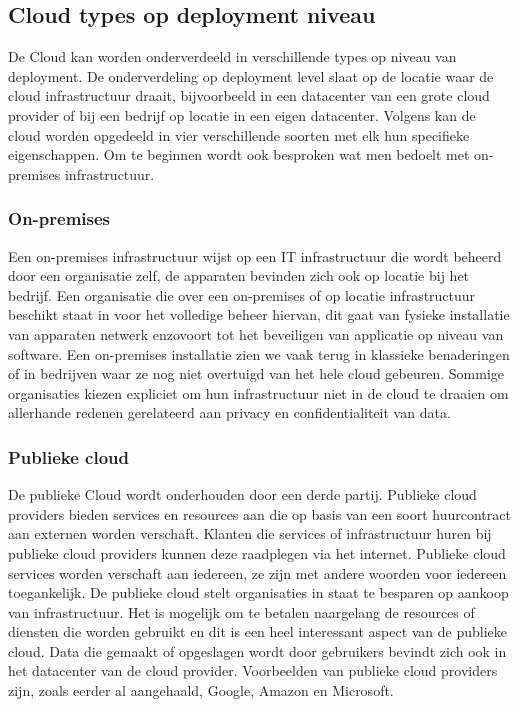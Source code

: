 \subsection{Cloud types op deployment niveau}
\label{cloud-deployment-level}
De Cloud kan worden onderverdeeld in verschillende types op niveau van deployment. De onderverdeling op deployment level slaat op de locatie waar de cloud infrastructuur draait, bijvoorbeeld in een datacenter van een grote cloud provider of bij een bedrijf op locatie in een eigen datacenter. Volgens \textcite{Goyal2014} kan de cloud worden opgedeeld in vier verschillende soorten met elk hun specifieke eigenschappen. Om te beginnen wordt ook besproken wat men bedoelt met on-premises infrastructuur.

\subsubsection{On-premises}
Een on-premises infrastructuur wijst op een IT infrastructuur die wordt beheerd door een organisatie zelf, de apparaten bevinden zich ook op locatie bij het bedrijf. Een organisatie die over een on-premises of op locatie infrastructuur beschikt staat in voor het volledige beheer hiervan, dit gaat van fysieke installatie van apparaten netwerk enzovoort tot het beveiligen van applicatie op niveau van software. Een on-premises installatie zien we vaak terug in klassieke benaderingen of in bedrijven waar ze nog niet overtuigd van het hele cloud gebeuren. Sommige organisaties kiezen expliciet om hun infrastructuur niet in de cloud te draaien om allerhande redenen gerelateerd aan privacy en confidentialiteit van data.

\subsubsection{Publieke cloud}
De publieke Cloud wordt onderhouden door een derde partij. Publieke cloud providers bieden services en resources aan die op basis van een soort huurcontract aan externen worden verschaft. Klanten die services of infrastructuur huren bij publieke cloud providers kunnen deze raadplegen via het internet. Publieke cloud services worden verschaft aan iedereen, ze zijn met andere woorden voor iedereen toegankelijk. De publieke cloud stelt organisaties in staat te besparen op aankoop van infrastructuur. Het is mogelijk om te betalen naargelang de resources of diensten die worden gebruikt en dit is een heel interessant aspect van de publieke cloud. Data die gemaakt of opgeslagen wordt door gebruikers bevindt zich ook in het datacenter van de cloud provider. Voorbeelden van publieke cloud providers zijn, zoals eerder al aangehaald, Google, Amazon en Microsoft.

